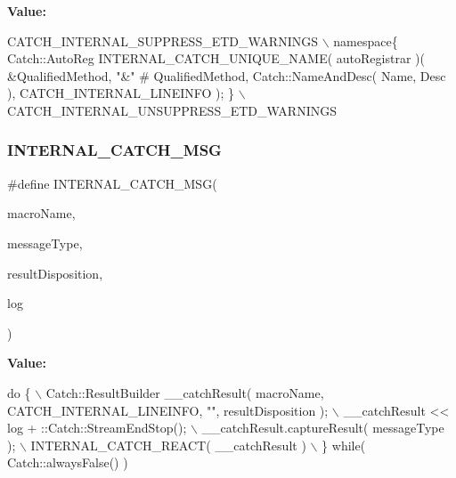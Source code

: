 {\bfseries Value\+:}
\begin{DoxyCode}
CATCH\_INTERNAL\_SUPPRESS\_ETD\_WARNINGS \(\backslash\)
        namespace\{ Catch::AutoReg INTERNAL_CATCH_UNIQUE_NAME( autoRegistrar )( &QualifiedMethod, \textcolor{stringliteral}{"&"} #
      QualifiedMethod, Catch::NameAndDesc( Name, Desc ), CATCH_INTERNAL_LINEINFO ); \} \(\backslash\)
        CATCH\_INTERNAL\_UNSUPPRESS\_ETD\_WARNINGS
\end{DoxyCode}
\mbox{\label{catch_8hpp_afd214490610769cbf22f4890701d7d7b}} 
\subsubsection{I\+N\+T\+E\+R\+N\+A\+L\+\_\+\+C\+A\+T\+C\+H\+\_\+\+M\+SG}
{\footnotesize\ttfamily \#define I\+N\+T\+E\+R\+N\+A\+L\+\_\+\+C\+A\+T\+C\+H\+\_\+\+M\+SG(\begin{DoxyParamCaption}\item[{}]{macro\+Name,  }\item[{}]{message\+Type,  }\item[{}]{result\+Disposition,  }\item[{}]{log }\end{DoxyParamCaption})}

{\bfseries Value\+:}
\begin{DoxyCode}
\textcolor{keywordflow}{do} \{ \(\backslash\)
            Catch::ResultBuilder \_\_catchResult( macroName, 
      CATCH_INTERNAL_LINEINFO, \textcolor{stringliteral}{""}, resultDisposition ); \(\backslash\)
            \_\_catchResult << log + ::Catch::StreamEndStop(); \(\backslash\)
            \_\_catchResult.captureResult( messageType ); \(\backslash\)
            INTERNAL\_CATCH\_REACT( \_\_catchResult ) \(\backslash\)
        \} \textcolor{keywordflow}{while}( Catch::alwaysFalse() )
\end{DoxyCode}
\mbox{\label{catch_8hpp_a37f7f24cf007d4054f8455951f7d6132}} 

